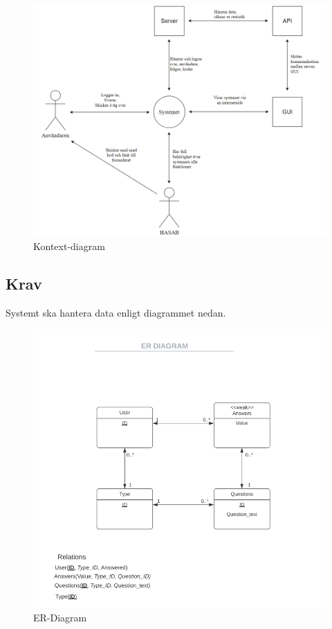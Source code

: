 \documentclass{article}
\begin{document}
    \begin{figure}[h!]
    \includegraphics[width=150mm]{Kontextdiagram.png}
    \caption{Kontext-diagram}
    \end{figure}
    
    \newpage
    \subsection{Krav}
    Systemt ska hantera data enligt diagrammet nedan.
       \begin{figure}[h!]
    
    \includegraphics[width=150mm]{ERDIAGRAM.png}
    \caption{ER-Diagram}
    \end{figure}
    
\end{document}
